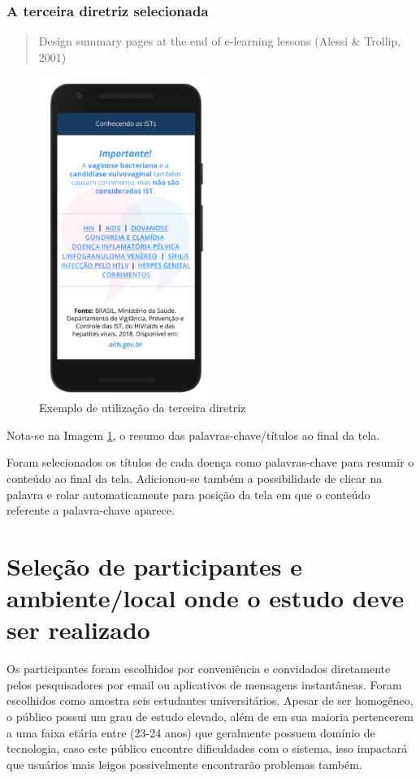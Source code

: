 \documentclass[12pt]{article}
\begin{document}
\subsubsection{A terceira diretriz selecionada}

\begin{quote}
	Design summary pages at the end of e-learning lessons (Alessi \& Trollip, 2001)
\end{quote}

\begin{figure}[H]
  \centering
  \includegraphics[width=15em]{images/image_3.png}
  \caption{Exemplo de utilização da terceira diretriz}
  \label{fig:img3}
\end{figure}

Nota-se na Imagem \ref{fig:img3}, o resumo das palavras-chave/títulos ao final da tela.

Foram selecionados os títulos de cada doença como palavras-chave para resumir o conteúdo ao final da tela. Adicionou-se também a possibilidade de clicar na palavra e rolar automaticamente para posição da tela em que o conteúdo referente a palavra-chave aparece.

\section{Seleção de participantes e ambiente/local onde o estudo deve ser realizado}

Os participantes foram escolhidos por conveniência e convidados diretamente pelos pesquisadores por email ou aplicativos de mensagens instantâneas. Foram escolhidos como amostra seis estudantes universitários. Apesar de ser homogêneo, o público possui um grau de estudo elevado, além de em sua maioria pertencerem a uma faixa etária entre (23-24 anos) que geralmente possuem domínio de tecnologia, caso este público encontre dificuldades com o sistema, isso impactará que usuários mais leigos possivelmente encontrarão problemas também. 
\end{document}
